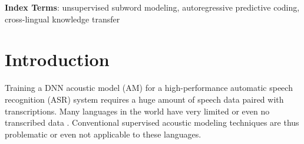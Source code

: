 \documentclass[a4paper]{article}
\begin{document}
\begin{abstract}

\end{abstract}
\noindent\textbf{Index Terms}: unsupervised subword modeling, autoregressive predictive coding, cross-lingual knowledge transfer

\section{Introduction}

Training a DNN acoustic model (AM) for a high-performance automatic speech recognition (ASR) system requires a huge amount of speech data paired with  transcriptions. 
Many languages in the world have very limited or even no transcribed data \cite{dunbar2017zero}. 
Conventional supervised acoustic modeling techniques are thus problematic or even not applicable to these languages.
\end{document}
